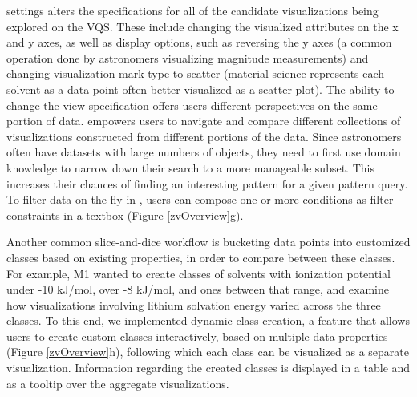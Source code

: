  settings 
alters the specifications 
for all of the candidate visualizations being explored 
on the VQS. 
These include changing 
the visualized attributes on the x and y axes, 
as well as display options, 
such as reversing the y axes 
(a common operation done by astronomers visualizing magnitude measurements) 
and changing visualization mark type to scatter
(material science represents each solvent 
as a data point often better visualized as a scatter plot). 
The ability to change the view specification 
offers users different perspectives on the same portion of data.
 empowers users to 
navigate and compare different collections 
of visualizations constructed 
from  different portions of the data. 
Since astronomers often have datasets 
with large numbers of objects, 
they need to first use domain knowledge 
to narrow down their search to a more manageable subset.
This increases their chances of finding an 
interesting pattern for a given pattern query. 
To filter data on-the-fly in \zvpp, 
users can compose one or more conditions 
as filter constraints in a textbox (Figure \ref{zvOverview}g). 
\par Another common slice-and-dice workflow is 
bucketing data points into customized classes 
based on existing properties, in order to compare between these classes. 
For example, M1 wanted to create classes of solvents with ionization potential under -10 kJ/mol, over -8 kJ/mol, and ones between that range, and 
examine how visualizations involving lithium solvation energy 
varied across the three classes. 
To this end, we implemented dynamic class creation, 
a feature that allows users to create custom classes interactively, 
based on multiple data properties (Figure \ref{zvOverview}h),
following which each class can be visualized as a separate visualization. 
Information regarding the created classes is displayed in a table and as a tooltip over the aggregate visualizations.
%
